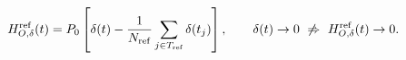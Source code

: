 \documentclass[12pt]{article}
\begin{document}
\fontsize{22}{28}\selectfont\[H_{O,\delta}^{\rm ref}(t)=P_0\left[\delta(t)-\frac{1}{N_{\rm ref}}\sum_{j\in T_{\rm ref}}\delta(t_j)\right],\qquad\delta(t)\to0\ \not\Rightarrow\ H_{O,\delta}^{\rm ref}(t)\to0.\]
\end{document}

